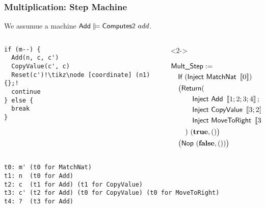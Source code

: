 \documentclass{beamer} %
\begin{document}
\begin{frame}
  \frametitle{Multiplication: Step Machine}
  \footnotesize
  
  We assumue a machine $\MS{Add} \VDash \MS{Computes2}~add$.

  \begin{columns}
    \begin{column}{0.4\textwidth}
\begin{lstlisting}[escapechar=!]
if (m--) {
  Add(n, c, c')
  CopyValue(c', c)
  Reset(c')!\tikz\node [coordinate] (n1) {};!
  continue
} else {
  break
}
\end{lstlisting}

    \end{column}

    \begin{column}{0.6\textwidth}
      \begin{overlayarea}{\textwidth}{5cm}
        \begin{onlyenv}<2->

          
          \begin{align*}
            & \textsf{Mult\_Step} := \\
            & \quad\textsf{If}~(\textsf{Inject}~\textsf{MatchNat}~\left\llbracket 0 \right\rrbracket) \\
            & \quad\bigl(\textsf{Return}( \bigr. \\
            & \quad\quad\quad \textsf{Inject}~\textsf{Add}~\left\llbracket 1; 2; 3; 4 \right\rrbracket; \\
            & \quad\quad\quad \textsf{Inject}~\textsf{CopyValue}~\left\llbracket 3;2 \right\rrbracket; \\
            & \quad\quad\quad \textsf{Inject}~\textsf{MoveToRight}~\left\llbracket 3 \right\rrbracket \\
            & \quad\quad\bigl. )~(\mathbf{true}, \mathbf{()} \bigr) \\
            & \quad\bigl(\textsf{Nop}~(\mathbf{false}, \mathbf{()})\bigr)
          \end{align*}
        \end{onlyenv}
      \end{overlayarea}
    \end{column}
    
  \end{columns}

\begin{lstlisting}
t0: m' (t0 for MatchNat)
t1: n  (t0 for Add)
t2: c  (t1 for Add) (t1 for CopyValue)
t3: c' (t2 for Add) (t0 for CopyValue) (t0 for MoveToRight)
t4: ?  (t3 for Add)
\end{lstlisting}

\end{frame}
\end{document}
